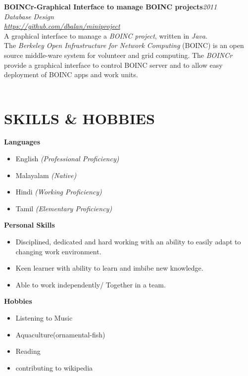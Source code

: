 \documentclass[line,margin]{res}
\begin{document}
\begin{resume}
  \textbf{ BOINCr-Graphical Interface to manage BOINC projects}\hfill \textit{2011}\\
  \textit{Database Design}\\
  \textit{\url{https://github.com/dbalan/miniproject}}\\
  A graphical interface to manage a \textit{BOINC project}, written in \textit{Java}.\\
  The \textit{Berkeley Open Infrastructure for Network Computing }(BOINC) is an open source middle-ware system for volunteer and grid computing. The \textit{BOINCr} provide a graphical interface to control BOINC server and to allow easy deployment of BOINC apps and work units.\\\\


  \section{SKILLS \& HOBBIES}
  \textbf{ Languages}
  \begin{itemize} \itemsep -2pt
  \item English \textit{(Professional Proficiency)}
  \item Malayalam \textit{(Native)}
  \item Hindi \textit{(Working Proficiency)}
  \item Tamil \textit{(Elementary Proficiency)}
  \end{itemize}
  \textbf{ Personal Skills}
  \begin{itemize} \itemsep -2pt
  \item Disciplined, dedicated and hard working with an ability to easily adapt to changing work environment.
  \item Keen learner with ability to learn and imbibe new knowledge.
  \item Able to work independently/ Together in a team.
  \end{itemize}
  \textbf{ Hobbies}
  \begin{itemize} \itemsep -2pt
  \item Listening to Music
  \item Aquaculture(ornamental-fish)
  \item Reading
  \item contributing to wikipedia
  \end{itemize}
  \vspace{10 mm}

\end{resume}
\end{document}
